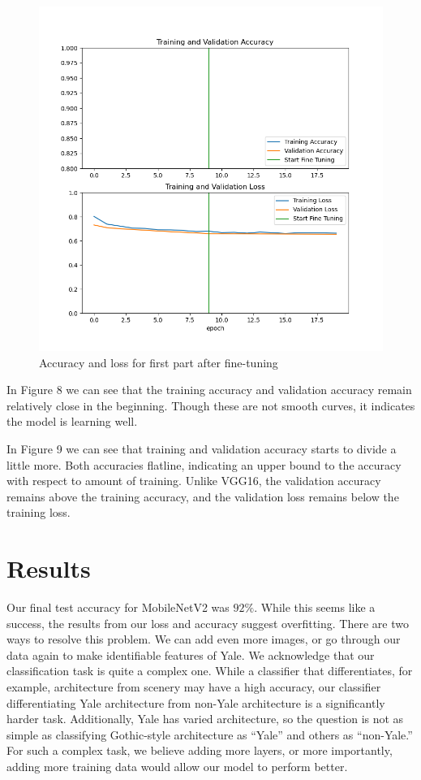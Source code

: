 \documentclass[letterpaper]{article} %
\begin{document}
\begin{figure}[h!]
\begin{minipage}{0.2\textwidth}
        \includegraphics[width=\textwidth]{vgg16_acc_loss_2.png}
        \caption{Accuracy and loss for first part after fine-tuning}
        \label{fig:fig2}
    \end{minipage}
\end{figure}


In Figure 8 we can see that the training accuracy and validation accuracy remain relatively close in the beginning. Though these are not smooth curves, it indicates the model is learning well. 

In Figure 9 we can see that training and validation accuracy starts to divide a little more. Both accuracies flatline, indicating an upper bound to the accuracy with respect to amount of training. Unlike VGG16, the validation accuracy remains above the training accuracy, and the validation loss remains below the training loss. 

\section{Results}

Our final test accuracy for MobileNetV2 was $92\%$. While this seems like a success, the results from our loss and accuracy suggest overfitting. There are two ways to resolve this problem. We can add even more images, or go through our data again to make identifiable features of Yale. We acknowledge that our classification task is quite a complex one. While a classifier that differentiates, for example, architecture from scenery may have a high accuracy, our classifier differentiating Yale architecture from non-Yale architecture is a significantly harder task. Additionally, Yale has varied architecture, so the question is not as simple as classifying Gothic-style architecture as “Yale” and others as “non-Yale.” For such a complex task, we believe adding more layers, or more importantly, adding more training data would allow our model to perform better.
\end{document}
